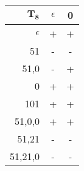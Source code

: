 \begingroup
\scriptsize
\begin{tabular}{r | c c}
    $\mathbf{T_8}$ & $\epsilon$ & 0\\ \hline
    $\epsilon$ & + & + \\
    51 & - & - \\
    51,0 & - & + \\ \hline
    0 & + & + \\
    101 & + & + \\
    51,0,0 & + & + \\
    51,21 & - & - \\
    51,21,0 & - & -
\end{tabular}
\endgroup
